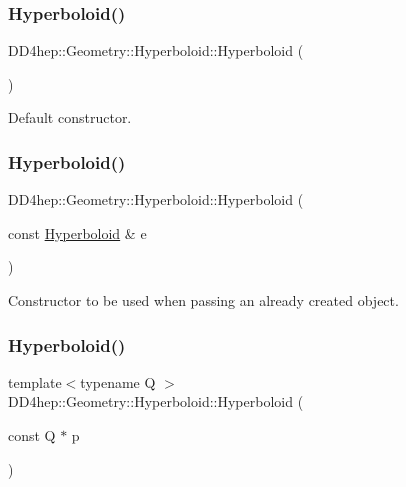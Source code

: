\subsubsection{\texorpdfstring{Hyperboloid()}{Hyperboloid()}\hspace{0.1cm}{\footnotesize\ttfamily [1/5]}}
{\footnotesize\ttfamily D\+D4hep\+::\+Geometry\+::\+Hyperboloid\+::\+Hyperboloid (\begin{DoxyParamCaption}{ }\end{DoxyParamCaption})\hspace{0.3cm}{\ttfamily [default]}}



Default constructor. 

\hypertarget{class_d_d4hep_1_1_geometry_1_1_hyperboloid_adbfe5d404f9ffdeda60a7237ef353211}{}\label{class_d_d4hep_1_1_geometry_1_1_hyperboloid_adbfe5d404f9ffdeda60a7237ef353211} 
\subsubsection{\texorpdfstring{Hyperboloid()}{Hyperboloid()}\hspace{0.1cm}{\footnotesize\ttfamily [2/5]}}
{\footnotesize\ttfamily D\+D4hep\+::\+Geometry\+::\+Hyperboloid\+::\+Hyperboloid (\begin{DoxyParamCaption}\item[{const \hyperlink{class_d_d4hep_1_1_geometry_1_1_hyperboloid}{Hyperboloid} \&}]{e }\end{DoxyParamCaption})\hspace{0.3cm}{\ttfamily [default]}}



Constructor to be used when passing an already created object. 

\hypertarget{class_d_d4hep_1_1_geometry_1_1_hyperboloid_a0d59d3bfa909a4dbea70a72ed7da9c02}{}\label{class_d_d4hep_1_1_geometry_1_1_hyperboloid_a0d59d3bfa909a4dbea70a72ed7da9c02} 
\subsubsection{\texorpdfstring{Hyperboloid()}{Hyperboloid()}\hspace{0.1cm}{\footnotesize\ttfamily [3/5]}}
{\footnotesize\ttfamily template$<$typename Q $>$ \\
D\+D4hep\+::\+Geometry\+::\+Hyperboloid\+::\+Hyperboloid (\begin{DoxyParamCaption}\item[{const Q $\ast$}]{p }\end{DoxyParamCaption})\hspace{0.3cm}{\ttfamily [inline]}}



